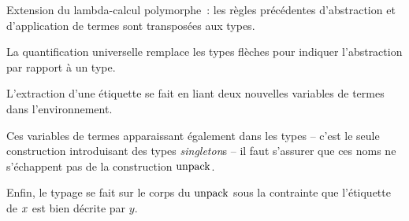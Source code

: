 \begin{mathpar}

\end{mathpar}
%
Extension du lambda-calcul polymorphe : les règles précédentes d'abstraction et
d'application de termes sont transposées aux types.

La quantification universelle remplace les types flèches pour indiquer
l'abstraction par rapport à un type.

\begin{mathpar}
\end{mathpar}
%
L'extraction d'une étiquette se fait en liant deux nouvelles variables de
termes dans l'environnement. 

Ces variables de termes apparaissant également dans les types -- c'est le seule
construction introduisant des types \emph{singleton}s -- il faut s'assurer que
ces noms ne s'échappent pas de la construction $\kw{unpack}$.

Enfin, le typage se fait sur le corps du $\kw{unpack}$ sous la contrainte que
l'étiquette de $\var$ est bien décrite par $y$.


